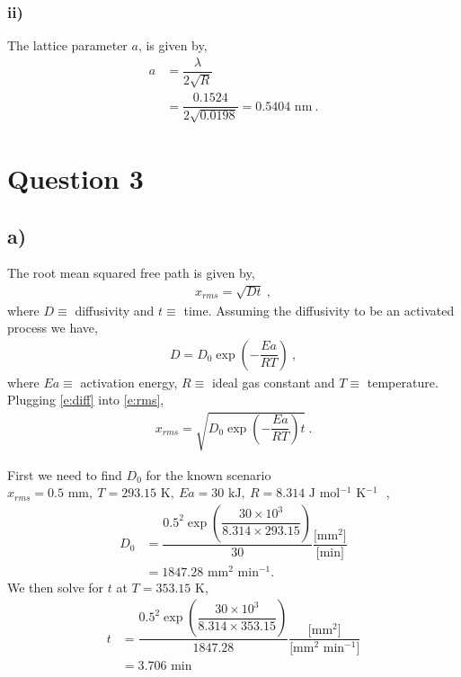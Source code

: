 \documentclass[a4paper]{article}
\begin{document}
	\subsubsection{ii)}
	The lattice parameter $a$, is given by,
	\begin{subequations}
		\begin{align}
			a &= \dfrac{\lambda}{2 \sqrt{R}}\\
			  &= \dfrac{0.1524}{2 \sqrt{0.0198}} = 0.5404 \textrm{ nm}~.
		\end{align}
	\end{subequations}
	
	\section{Question 3}
	\subsection{a)}
	The root mean squared free path is given by,
	\begin{align}
		x_{rms} = \sqrt{D t}~,\label{e:rms}
	\end{align}
	where $D \equiv $ diffusivity and $t \equiv$ time. Assuming the diffusivity to be an activated process we have,
	\begin{align}
		D = D_{0} \exp\left(-\dfrac{Ea}{RT}\right)~,\label{e:diff}
	\end{align}
	where $Ea \equiv$ activation energy, $R \equiv $ ideal gas constant and $T \equiv$ temperature. Plugging \cref{e:diff} into \cref{e:rms},
	\begin{align}
		x_{rms} = \sqrt{D_{0} \exp\left(-\dfrac{Ea}{RT}\right) t}~.\label{e:rmsdiff}
	\end{align}
	
	First we need to find $D_{0}$ for the known scenario $x_{rms} = 0.5 \textrm{ mm},~ T = 293.15 \textrm{ K},~ Ea = 30 \text{ kJ},~ R = 8.314 \text{ J mol$^{-1}$ K$^{-1}$ }$,
	\begin{subequations}
	\begin{align}
		D_{0} &= \dfrac{0.5^{2} \exp\left(\dfrac{30 \times 10^{3}}{8.314 \times 293.15}\right) }{30} \dfrac{\textrm{[mm$^2$]}}{\textrm{[min]}}\\
			  &= 1847.28 \textrm{ mm$^2$ min$^{-1}$}.~
	\end{align}
	\end{subequations}
	We then solve for $t$ at $T = 353.15 \textrm{ K}$,
	\begin{subequations}
	\begin{align}
		t &= \dfrac{0.5^{2} \exp\left(\dfrac{30 \times 10^{3}}{8.314 \times 353.15}\right) }{1847.28} \dfrac{\textrm{[mm$^2$]}}{\textrm{[mm$^2$ min$^{-1}$]}}\\
		  &= 3.706 \textrm{ min}
	\end{align}
	\end{subequations}
\end{document}
